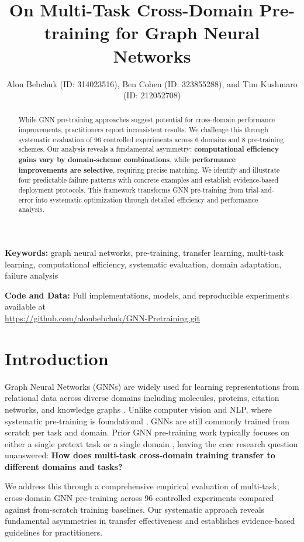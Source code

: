 \documentclass[11pt]{article}
\title{On Multi-Task Cross-Domain Pre-training for Graph Neural Networks}
\author{
  Alon Bebchuk (ID: 314023516), 
  Ben Cohen (ID: 323855288), 
  and Tim Kushmaro (ID: 212052708) \\
}
\begin{document}
\maketitle

\begin{abstract}\normalfont\normalsize
While GNN pre-training approaches suggest potential for cross-domain performance improvements, practitioners report inconsistent results. We challenge this through systematic evaluation of 96 controlled experiments across 6 domains and 8 pre-training schemes. Our analysis reveals a fundamental asymmetry: \textbf{computational efficiency gains vary by domain-scheme combinations}, while \textbf{performance improvements are selective}, requiring precise matching. We identify and illustrate four predictable failure patterns with concrete examples and establish evidence-based deployment protocols. This framework transforms GNN pre-training from trial-and-error into systematic optimization through detailed efficiency and performance analysis.
\end{abstract}

\textbf{Keywords:} graph neural networks, pre-training, transfer learning, multi-task learning, computational efficiency, systematic evaluation, domain adaptation, failure analysis

\textbf{Code and Data:} Full implementations, models, and reproducible experiments available at \\\url{https://github.com/alonbebchuk/GNN-Pretraining.git}

\section{Introduction}
Graph Neural Networks (GNNs) are widely used for learning representations from relational data across diverse domains including molecules, proteins, citation networks, and knowledge graphs \citep{zhou2020graph}.
Unlike computer vision and NLP, where systematic pre-training is foundational \citep{he2016deep,devlin2019bert}, GNNs are still commonly trained from scratch per task and domain.
Prior GNN pre-training work typically focuses on either a single pretext task or a single domain \citep{hu2019strategies}, leaving the core research question unanswered: \textbf{How does multi-task cross-domain training transfer to different domains and tasks?}

We address this through a comprehensive empirical evaluation of multi-task, cross-domain GNN pre-training across 96 controlled experiments compared against from-scratch training baselines. Our systematic approach reveals fundamental asymmetries in transfer effectiveness and establishes evidence-based guidelines for practitioners.
\end{document}
